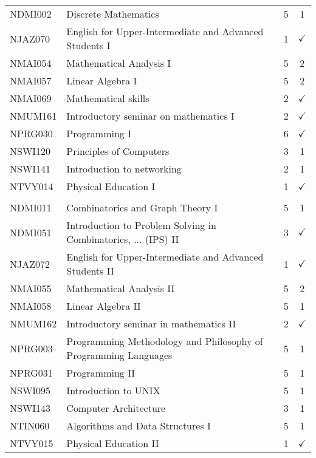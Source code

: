 \documentclass[a4paper,10pt]{article}
\begin{document}
\begin{center}

\tabletail{%
}
\tablelasttail{}	

\begin{supertabular}{l l c c}
\\
 
 
NDMI002 & Discrete Mathematics & 5 & 1\\
NJAZ070 & English for Upper-Intermediate and Advanced Students I & 1 & $\checkmark$\\
NMAI054 & Mathematical Analysis I & 5 & 2\\
NMAI057 & Linear Algebra I & 5 & 2\\
NMAI069 & Mathematical skills & 2 & $\checkmark$\\
NMUM161 & Introductory seminar on mathematics I & 2 & $\checkmark$\\
NPRG030 & Programming I & 6 & $\checkmark$\\
NSWI120 & Principles of Computers & 3 & 1\\
NSWI141 & Introduction to networking & 2 & 1\\
NTVY014 & Physical Education I & 1 & $\checkmark$\\

\hline\\

NDMI011 & Combinatorics and Graph Theory I & 5 & 1\\

NDMI051 & Introduction to Problem Solving in Combinatorics, ... (IPS) II & 3 & $\checkmark$\\

NJAZ072 & English for Upper-Intermediate and Advanced Students II & 1 & $\checkmark$\\
NMAI055 & Mathematical Analysis II & 5 & 2\\
NMAI058 & Linear Algebra II & 5 & 1\\
NMUM162 & Introductory seminar in mathematics II & 2 & $\checkmark$\\
NPRG003 & Programming Methodology and Philosophy of Programming Languages & 5 & 1\\
NPRG031 & Programming II & 5 & 1\\
NSWI095 & Introduction to UNIX & 5 & 1\\
NSWI143 & Computer Architecture & 3 & 1\\
NTIN060 & Algorithms and Data Structures I & 5 & 1\\
NTVY015 & Physical Education II & 1 & $\checkmark$\\
 


\end{supertabular}
\end{center}
\end{document}
